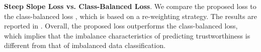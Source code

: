 

\noindent\textbf{Steep Slope Loss vs. Class-Balanced Loss}.
We compare the proposed loss to the class-balanced loss \cite{Cui_CVPR_2019}, which is based on a re-weighting strategy.
The results are reported in .
Overall, the proposed loss outperforms the class-balanced loss, which implies that the imbalance characteristics of predicting trustworthiness is different from that of imbalanced data classification.

